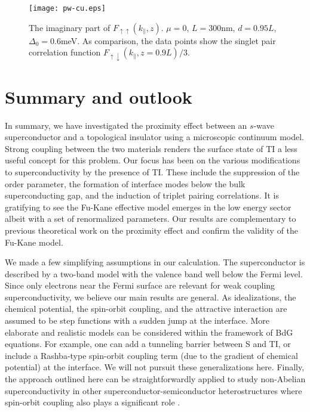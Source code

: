 \documentclass[12pt,twocolumn]{article}
\begin{document}
\begin{figure}
\texttt{[image: pw-cu.eps]}
\caption{The imaginary part of 
$F_{\uparrow\uparrow}(k_\parallel,z)$. $\mu=0$, $L=300$nm, $d=0.95L$, $\Delta_0=0.6$meV.
As comparison, the data points show the singlet pair correlation function 
$F_{\uparrow\downarrow}(k_\parallel,z=0.9L)/3$.
}\label{pw-cu}
\end{figure}

\section{Summary and outlook}
In summary, we have investigated the proximity effect between an $s$-wave superconductor
and a topological insulator using a microscopic continuum model. 
Strong coupling between the two materials renders the surface state of TI a less 
useful concept for this problem.
Our focus has been on the various modifications to superconductivity by the presence of TI. 
These include the suppression of the order parameter, the formation of interface modes
below the bulk superconducting gap, and the induction of triplet pairing correlations.
It is gratifying to see the Fu-Kane effective model emerges in the low energy sector
albeit with a set of renormalized parameters. Our results are complementary to
previous theoretical work on the proximity effect \cite{f-k,stan} and confirm the validity
of the Fu-Kane model.

We made a few simplifying assumptions in our calculation. The superconductor is described 
by a two-band model with the valence band well below the Fermi level. Since only 
electrons near the Fermi surface are relevant for weak coupling superconductivity, we 
believe our main results are general. As idealizations, the chemical 
potential, the spin-orbit coupling, and the attractive interaction are assumed to be 
step functions with a sudden jump at the interface. 
More elaborate and realistic models can be considered within the framework of BdG equations.
For example, one can add a tunneling barrier between S and TI, 
or include a Rashba-type spin-orbit coupling term 
(due to the gradient of chemical potential) at the interface. We will not 
pursuit these generalizations here.
Finally, the approach outlined here can be straightforwardly applied to 
study non-Abelian superconductivity in other superconductor-semiconductor
heterostructures where spin-orbit coupling also plays a significant role
\cite{roman,maryland,jason,mao1,mao2}.
\end{document}
